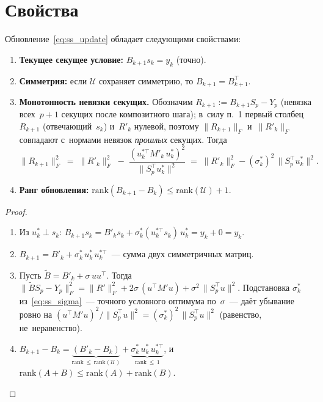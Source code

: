 \section{Свойства}\label{sec:ss_properties}

\begin{theorem}\label{thm:ss_props}
Обновление~\eqref{eq:ss_update} обладает следующими свойствами:
\begin{enumerate}
  \item \textbf{Текущее секущее условие:}
    $B_{k+1} s_k = y_k$ (точно).
  \item \textbf{Симметрия:}
    если $\mathcal{U}$ сохраняет симметрию, то $B_{k+1} = B_{k+1}^\top$.
  \item \textbf{Монотонность невязки секущих.} Обозначим
    $R_{k+1} := B_{k+1} S_p - Y_p$ (невязка всех~$p{+}1$ секущих
    после композитного шага); в~силу п.~1 первый столбец $R_{k+1}$
    (отвечающий~$s_k$) и~$R'_k$ нулевой, поэтому $\|R_{k+1}\|_F$ и~$\|R'_k\|_F$
    совпадают с~нормами невязок \emph{прошлых} секущих. Тогда
    \[
      \|R_{k+1}\|_F^2
        \;=\; \|R'_k\|_F^2
        \;-\; \frac{(u_k^{*\top} M'_k\, u_k^*)^2}{\|S_p^\top u_k^*\|^2}
        \;=\; \|R'_k\|_F^2 - (\sigma_k^*)^2\,\|S_p^\top u_k^*\|^2.
    \]
  \item \textbf{Ранг обновления:}
    $\mathrm{rank}(B_{k+1} - B_k) \leq \mathrm{rank}(\mathcal{U}) + 1$.
\end{enumerate}
\end{theorem}

\begin{proof}\leavevmode
\begin{enumerate}
  \item Из $u_k^* \perp s_k$:
    $B_{k+1} s_k = B'_k s_k + \sigma_k^*(u_k^{*\top} s_k)\, u_k^* = y_k + 0 = y_k$.
  \item $B_{k+1} = B'_k + \sigma_k^*\, u_k^*\, u_k^{*\top}$~---
    сумма двух симметричных матриц.
  \item Пусть $\tilde{B} = B'_k + \sigma\, u u^\top$. Тогда
    $\|\tilde{B} S_p - Y_p\|_F^2
    = \|R'\|_F^2 + 2\sigma\,(u^\top M' u) + \sigma^2\,\|S_p^\top u\|^2$.
    Подстановка $\sigma_k^*$ из~\eqref{eq:ss_sigma}~--- точного условного
    оптимума по~$\sigma$~--- даёт убывание ровно на
    $(u^\top M' u)^2 / \|S_p^\top u\|^2 = (\sigma_k^*)^2\,\|S_p^\top u\|^2$
    (равенство, не~неравенство).
  \item $B_{k+1} - B_k = \underbrace{(B'_k - B_k)}_{\mathrm{rank}\,\le\,\mathrm{rank}(\mathcal{U})}
        + \underbrace{\sigma_k^*\, u_k^*\, u_k^{*\top}}_{\mathrm{rank}\,\le\,1}$,
        и~$\mathrm{rank}(A+B)\le\mathrm{rank}(A)+\mathrm{rank}(B)$. \qedhere
\end{enumerate}
\end{proof}


